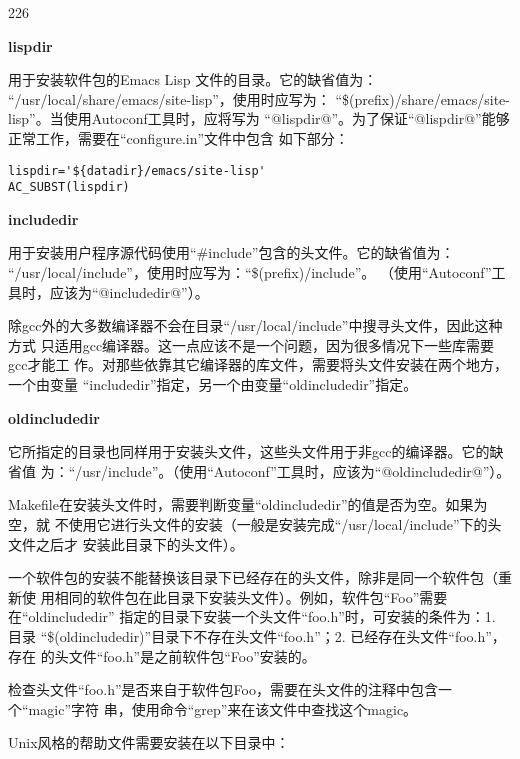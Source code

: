 \begin{dinglist}{226}
\item \textbf{lispdir}

用于安装软件包的Emacs Lisp 文件的目录。它的缺省值为：
“/usr/local/share/emacs/site-lisp”，使用时应写为：
“\$(prefix)/share/emacs/site-lisp”。当使用Autoconf工具时，应将写为
“@lispdir@”。为了保证“@lispdir@”能够正常工作，需要在“configure.in”文件中包含
如下部分：

\begin{Verbatim}[]
lispdir='${datadir}/emacs/site-lisp'
AC_SUBST(lispdir)
\end{Verbatim}

\item \textbf{includedir}

用于安装用户程序源代码使用“\#include”包含的头文件。它的缺省值为：
“/usr/local/include”，使用时应写为：“\$(prefix)/include”。 （使用“Autoconf”工
具时，应该为“@includedir@”）。

除gcc外的大多数编译器不会在目录“/usr/local/include”中搜寻头文件，因此这种方式
只适用gcc编译器。这一点应该不是一个问题，因为很多情况下一些库需要gcc才能工
作。对那些依靠其它编译器的库文件，需要将头文件安装在两个地方，一个由变量
“includedir”指定，另一个由变量“oldincludedir”指定。

\item \textbf{oldincludedir}

它所指定的目录也同样用于安装头文件，这些头文件用于非gcc的编译器。它的缺省值
为：“/usr/include”。（使用“Autoconf”工具时，应该为“@oldincludedir@”）。

Makefile在安装头文件时，需要判断变量“oldincludedir”的值是否为空。如果为空，就
不使用它进行头文件的安装（一般是安装完成“/usr/local/include”下的头文件之后才
安装此目录下的头文件）。

一个软件包的安装不能替换该目录下已经存在的头文件，除非是同一个软件包（重新使
用相同的软件包在此目录下安装头文件）。例如，软件包“Foo”需要在“oldincludedir”
指定的目录下安装一个头文件“foo.h”时，可安装的条件为：1. 目录
“\$(oldincludedir)”目录下不存在头文件“foo.h”；2. 已经存在头文件“foo.h”，存在
的头文件“foo.h”是之前软件包“Foo”安装的。

检查头文件“foo.h”是否来自于软件包Foo，需要在头文件的注释中包含一个“magic”字符
串，使用命令“grep”来在该文件中查找这个magic。
\end{dinglist}

Unix风格的帮助文件需要安装在以下目录中：

